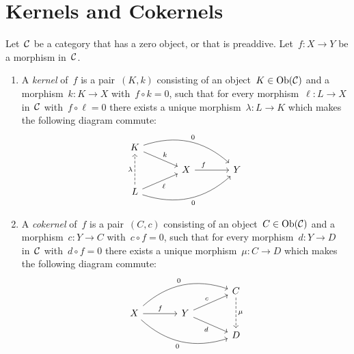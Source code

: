 \section{Kernels and Cokernels}


\begin{definition}
  Let~$\mathcal{C}$ be a category that has a zero object, or that is preaddive.
  Let~$f \colon X \to Y$ be a morphism in~$\mathcal{C}$.
  \begin{enumerate}
      \item
        A \emph{kernel} of~$f$ is a pair~$(K,k)$ consisting of an object~$K \in \operatorname{Ob}(\mathcal{C})$ and a morphism~$k \colon K \to X$ with~$f \circ k = 0$, such that for every morphism~$\ell \colon L \to X$ in~$\mathcal{C}$ with~$f \circ \ell = 0$ there exists a unique morphism~$\lambda \colon L \to K$ which makes the following diagram commute:
        \[
          \begin{tikzcd}[row sep = small, column sep = large]
              K
              \arrow{dr}[above right]{k}
              \arrow[bend left]{drr}[above right]{0}
            & {}
            & {}
            \\
              {}
            & X
              \arrow{r}[above, near start]{f}
            & Y
            \\
              L
              \arrow{ur}[below right]{\ell}
              \arrow[bend right]{urr}[below right]{0}
              \arrow[dashed]{uu}[left]{\lambda}
            & {}
            & {}
          \end{tikzcd}
        \]
      \item
        A \emph{cokernel} of~$f$ is a pair~$(C,c)$ consisting of an object~$C \in \operatorname{Ob}(\mathcal{C})$ and a morphism~$c \colon Y \to C$ with~$c \circ f = 0$, such that for every morphism~$d \colon Y \to D$ in~$\mathcal{C}$ with~$d \circ f = 0$ there exists a unique morphism~$\mu \colon C \to D$ which makes the following diagram commute:
        \[
          \begin{tikzcd}[row sep = small, column sep = large]
              {}
            & {}
            & C
              \arrow[dashed]{dd}[right]{\mu}
            \\
              X
              \arrow{r}[above]{f}
              \arrow[bend left]{urr}[above left]{0}
              \arrow[bend right]{drr}[below left]{0}
            & Y
              \arrow{ur}[above left]{c}
              \arrow{dr}[below left]{d}
            & {}
            \\
              {}
            & {}
            & D
          \end{tikzcd}
        \]
  \end{enumerate}
\end{definition}


